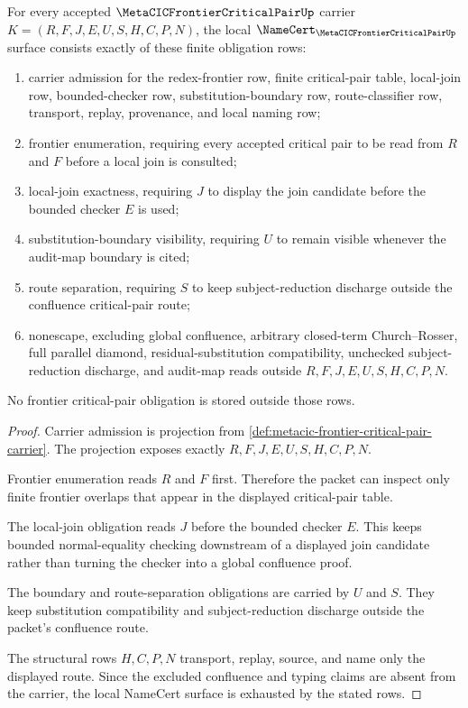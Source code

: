 \begin{theorem}
\label{thm:metacic-frontier-critical-pair-namecert-obligations}
For every accepted $\MetaCICFrontierCriticalPairUp$ carrier $K=(R,F,J,E,U,S,H,C,P,N)$, the local $\NameCert_{\MetaCICFrontierCriticalPairUp}$ surface consists exactly of these finite obligation rows:
\begin{enumerate}
\item carrier admission for the redex-frontier row, finite critical-pair table, local-join row, bounded-checker row, substitution-boundary row, route-classifier row, transport, replay, provenance, and local naming row;
\item frontier enumeration, requiring every accepted critical pair to be read from $R$ and $F$ before a local join is consulted;
\item local-join exactness, requiring $J$ to display the join candidate before the bounded checker $E$ is used;
\item substitution-boundary visibility, requiring $U$ to remain visible whenever the audit-map boundary is cited;
\item route separation, requiring $S$ to keep subject-reduction discharge outside the confluence critical-pair route;
\item nonescape, excluding global confluence, arbitrary closed-term Church--Rosser, full parallel diamond, residual-substitution compatibility, unchecked subject-reduction discharge, and audit-map reads outside $R,F,J,E,U,S,H,C,P,N$.
\end{enumerate}
No frontier critical-pair obligation is stored outside those rows.
\end{theorem}
\begin{proof}
Carrier admission is projection from \autoref{def:metacic-frontier-critical-pair-carrier}. The projection exposes exactly $R,F,J,E,U,S,H,C,P,N$.

Frontier enumeration reads $R$ and $F$ first. Therefore the packet can inspect only finite frontier overlaps that appear in the displayed critical-pair table.

The local-join obligation reads $J$ before the bounded checker $E$. This keeps bounded normal-equality checking downstream of a displayed join candidate rather than turning the checker into a global confluence proof.

The boundary and route-separation obligations are carried by $U$ and $S$. They keep substitution compatibility and subject-reduction discharge outside the packet's confluence route.

The structural rows $H,C,P,N$ transport, replay, source, and name only the displayed route. Since the excluded confluence and typing claims are absent from the carrier, the local NameCert surface is exhausted by the stated rows.
\end{proof}

